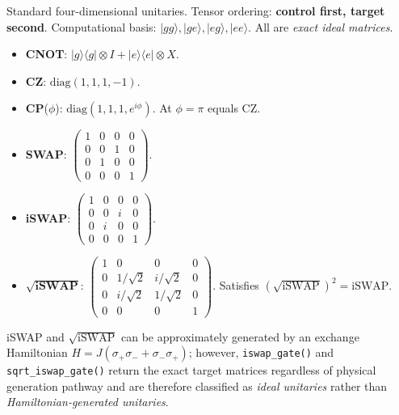 \documentclass[11pt]{article}
\begin{document}
\noindent
Standard four-dimensional unitaries. Tensor ordering: \textbf{control first,
target second}. Computational basis: \(|gg\rangle, |ge\rangle, |eg\rangle,
|ee\rangle\). All are \emph{exact ideal matrices}.

\begin{itemize}[leftmargin=1.5em]
  \item \textbf{CNOT}: \(|g\rangle\langle g|\otimes I + |e\rangle\langle e|\otimes X\).
  \item \textbf{CZ}: \(\mathrm{diag}(1,1,1,-1)\).
  \item \textbf{CP}(\(\phi\)): \(\mathrm{diag}(1,1,1,e^{i\phi})\).
        At \(\phi=\pi\) equals CZ.
  \item \textbf{SWAP}:
        \(\begin{pmatrix}1&0&0&0\\0&0&1&0\\0&1&0&0\\0&0&0&1\end{pmatrix}\).
  \item \textbf{iSWAP}:
        \(\begin{pmatrix}1&0&0&0\\0&0&i&0\\0&i&0&0\\0&0&0&1\end{pmatrix}\).
  \item \(\mathbf{\sqrt{\text{iSWAP}}}\):
        \(\begin{pmatrix}1&0&0&0\\0&1/\sqrt{2}&i/\sqrt{2}&0\\0&i/\sqrt{2}&1/\sqrt{2}&0\\0&0&0&1\end{pmatrix}\).
        Satisfies \((\sqrt{\text{iSWAP}})^2 = \text{iSWAP}\).
\end{itemize}

\noindent
iSWAP and \(\sqrt{\text{iSWAP}}\) can be approximately generated by an
exchange Hamiltonian \(H = J(\sigma_+\sigma_- + \sigma_-\sigma_+)\); however,
\texttt{iswap\_gate()} and \texttt{sqrt\_iswap\_gate()} return the exact
target matrices regardless of physical generation pathway and are therefore
classified as \emph{ideal unitaries} rather than \emph{Hamiltonian-generated
unitaries}.
\end{document}
